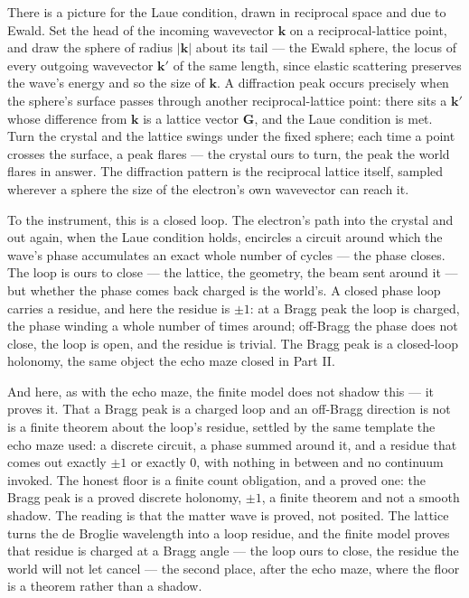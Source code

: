 There is a picture for the Laue condition, drawn in reciprocal space and due to Ewald. Set the head of the
incoming wavevector $\mathbf{k}$ on a reciprocal-lattice point, and draw the sphere of radius $|\mathbf{k}|$
about its tail --- the Ewald sphere, the locus of every outgoing wavevector $\mathbf{k}'$ of the same length,
since elastic scattering preserves the wave's energy and so the size of $\mathbf{k}$. A diffraction peak
occurs precisely when the sphere's surface passes through another reciprocal-lattice point: there sits a
$\mathbf{k}'$ whose difference from $\mathbf{k}$ is a lattice vector $\mathbf{G}$, and the Laue condition is
met. Turn the crystal and the lattice swings under the fixed sphere; each time a point crosses the surface, a
peak flares --- the crystal ours to turn, the peak the world flares in answer. The diffraction pattern is the reciprocal lattice itself, sampled wherever a sphere the size of
the electron's own wavevector can reach it.

To the instrument, this is a closed loop. The electron's path into the crystal and out again, when the
Laue condition holds, encircles a circuit around which the wave's phase accumulates an exact whole number of
cycles --- the phase closes. The loop is ours to close --- the lattice, the geometry, the beam sent around it
--- but whether the phase comes back charged is the world's. A closed phase loop carries a residue, and here the residue is $\pm 1$: at a Bragg
peak the loop is charged, the phase winding a whole number of times around; off-Bragg the phase does not close,
the loop is open, and the residue is trivial. The Bragg peak is a closed-loop holonomy, the same object the
echo maze closed in Part II.

And here, as with the echo maze, the finite model does not shadow this --- it proves it. That a Bragg peak is a
charged loop and an off-Bragg direction is not is a finite theorem about the loop's residue, settled by the
same template the echo maze used: a discrete circuit, a phase summed around it, and a residue that comes out
exactly $\pm 1$ or exactly $0$, with nothing in between and no continuum invoked. The honest floor is a finite
count obligation, and a proved one: the Bragg peak is a proved discrete holonomy, $\pm 1$, a finite theorem and
not a smooth shadow. The reading is that the matter wave is proved, not posited. The lattice turns the de
Broglie wavelength into a loop residue, and the finite model proves that residue is charged at a Bragg angle
--- the loop ours to close, the residue the world will not let cancel --- the second place, after the echo
maze, where the floor is a theorem rather than a shadow.

